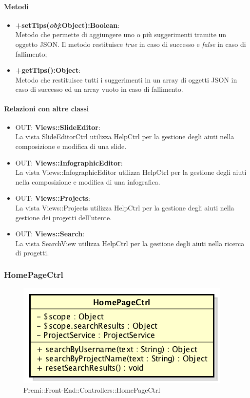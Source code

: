 	\paragraph{Metodi}
	\begin{itemize}
	  \item \textbf{+setTips(\textit{obj}:Object):Boolean}:\\
		  Metodo che permette di aggiungere uno o più suggerimenti tramite un oggetto JSON. Il metodo restituisce \textit{true} in caso di successo e \textit{false} in caso di fallimento;
	  \item \textbf{+getTips():Object}:\\
		  Metodo che restituisce tutti i suggerimenti in un array di oggetti JSON in caso di successo ed un array vuoto in caso di fallimento.
	\end{itemize}
	\paragraph{Relazioni con altre classi}
	\begin{itemize}
	 \item OUT: \textbf{Views::SlideEditor}:\\
		La vista SlideEditorCtrl utilizza HelpCtrl per la gestione degli aiuti nella composizione e modifica di una slide.
	 \item OUT: \textbf{Views::InfographicEditor}:\\
		La vista Views::InfographicEditor utilizza HelpCtrl per la gestione degli aiuti nella composizione e modifica di una infografica.
	 \item OUT: \textbf{Views::Projects}:\\
		La vista Views::Projects utilizza HelpCtrl per la gestione degli aiuti nella gestione dei progetti dell'utente.
	 \item OUT: \textbf{Views::Search}:\\
		La vista SearchView utilizza HelpCtrl per la gestione degli aiuti nella ricerca di progetti.
	\end{itemize}

\newpage
\subsubsection{HomePageCtrl}
\begin{figure}[h]
	\centering
	\includegraphics[width=0.5\linewidth]{img/premi_front_end_controllers_homepagectrl}
	\caption[Premi::Front-End::Controllers::HomePageCtrl]{Premi::Front-End::Controllers::HomePageCtrl}
\end{figure}
